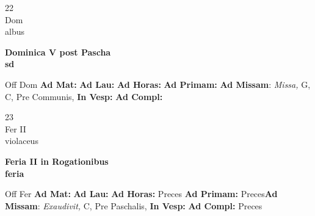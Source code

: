 \documentclass[10pt, openany]{book}
\begin{document}
    \begin{center}
        \begin{minipage}{3.5in}
            \vspace{2em}
            \begin{minipage}{0.5in}
                {\Huge 22} \\
                {\normalsize Dom} \\
                {\normalsize albus}
            \end{minipage}
            \begin{minipage}{3.0in}
                \textbf{ \large Dominica V post Pascha \\
                \textnormal{\normalsize sd}} \\ 
            \end{minipage}
            \begin{justify}Off Dom
                \textbf{Ad Mat: }
                \textbf{Ad Lau: }
                \textbf{Ad Horas: }
                \textbf{Ad Primam: }\textbf{Ad Missam}: \textit{Missa,} G, C, Pre Communis,  
                \textbf{In Vesp: }
                \textbf{Ad Compl: }
            \end{justify}
        \end{minipage}
    \end{center}

    \begin{center}
        \begin{minipage}{3.5in}
            \vspace{2em}
            \begin{minipage}{0.5in}
                {\Huge 23} \\
                {\normalsize Fer II} \\
                {\normalsize violaceus}
            \end{minipage}
            \begin{minipage}{3.0in}
                \textbf{ \large Feria II in Rogationibus \\
                \textnormal{\normalsize feria}} \\ 
            \end{minipage}
            \begin{justify}Off Fer
                \textbf{Ad Mat: }
                \textbf{Ad Lau: }
                \textbf{Ad Horas: }Preces
                \textbf{Ad Primam: }Preces\textbf{Ad Missam}: \textit{Exaudivit,} C, Pre Paschalis,  
                \textbf{In Vesp: }
                \textbf{Ad Compl: }Preces
            \end{justify}
        \end{minipage}
    \end{center}
\end{document}

